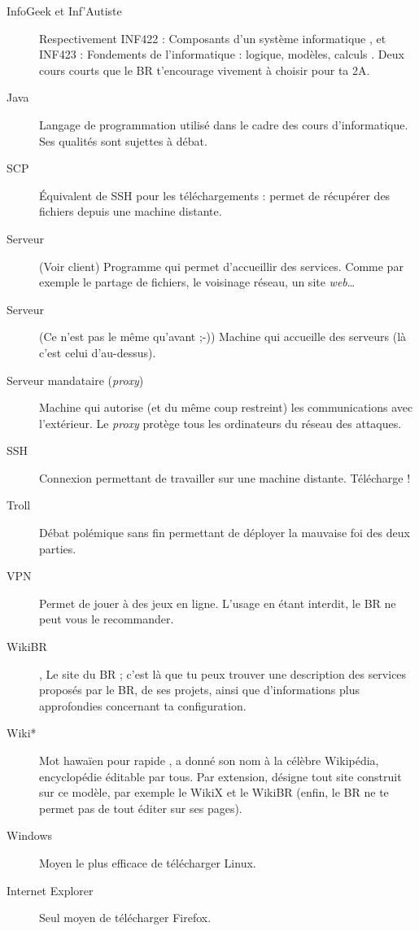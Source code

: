 \begin{description}
  \item[InfoGeek et Inf'Autiste] Respectivement INF422 : \og Composants d'un système informatique \fg, et INF423 : \og Fondements de l'informatique : logique, modèles, calculs \fg.
Deux cours courts que le BR t'encourage vivement à choisir pour ta 2A.

  
   \item[Java] Langage de programmation utilisé dans le cadre des cours d'informatique. Ses qualités sont sujettes à débat.
   
   
  \item[SCP] Équivalent de SSH pour les téléchargements : permet de récupérer des fichiers depuis une machine distante.
  
  \item[Serveur] (Voir client) Programme qui permet d'accueillir des services. Comme par exemple le partage de fichiers, le voisinage réseau, un site \emph{web}\ldots\
  \item[Serveur] (Ce n'est pas le même qu'avant ;-)) Machine qui accueille des serveurs (là c'est celui d'au-dessus).
  
  \item[Serveur mandataire (\emph{proxy})] Machine qui autorise
(et du même coup restreint) les communications avec l'extérieur. Le \emph{proxy} protège tous les ordinateurs du réseau des attaques.

  \item[SSH] Connexion permettant de travailler sur une machine distante. Télécharge  !
  
  \item[Troll] Débat polémique sans fin permettant de déployer la mauvaise foi des deux parties.
  \item[VPN] Permet de jouer à des jeux en ligne. L'usage en étant interdit, le BR ne peut vous le recommander.
  
  \item[WikiBR] , Le site du BR ; c'est là que tu peux trouver une description des services proposés par le BR, de ses projets, ainsi que
  d'informations plus approfondies concernant ta configuration.
  
  \item[Wiki*] Mot hawa\"ien pour \og rapide \fg, a donné son nom à la célèbre Wikipédia, encyclopédie éditable par tous.
  Par extension, désigne tout site construit sur ce modèle, par exemple le WikiX et le WikiBR (enfin, le BR ne te permet pas de tout éditer sur ses pages).
  
  \item[Windows] Moyen le plus efficace de télécharger Linux.
  
  \item[Internet Explorer] Seul moyen de télécharger Firefox.
  
\end{description}
